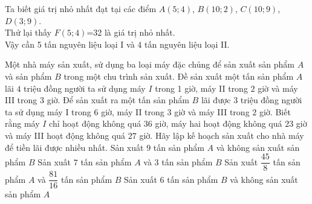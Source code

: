 \begin{ex}
{\begin{center}
		\end{center}
		Ta biết giá trị nhỏ nhất đạt tại các điểm $A(5;4)$, $B(10;2)$, $C(10;9)$, $D(3;9)$.\\
		Thử lại thấy $F(5;4)$=32 là giá trị nhỏ nhất.\\
		Vậy cần 5 tấn nguyên liệu loại I và 4 tấn nguyên liệu loại II.
	}
\end{ex}

\begin{ex}%
	Một nhà máy sản xuất, sử dụng ba loại máy đặc chủng để sản xuất sản phẩm $A$ và sản phẩm $B$ trong một chu trình sản xuất. Đề sản xuất một tấn sản phẩm $A$ lãi $4$ triệu đồng người ta sử dụng máy $I$ trong 1 giờ, máy II trong $2$ giờ và máy III trong $3$ giờ. Để sản xuất ra một tấn sản phẩm $B$ lãi được $3$ triệu đồng người ta sử dụng máy I trong $6$ giờ, máy II trong $3$ giờ và máy III trong $2$ giờ. Biết rằng máy $I$ chỉ hoạt động không quá $36$ giờ, máy hai hoạt động không quá $23$ giờ và máy III hoạt động không quá $27$ giờ. Hãy lập kế hoạch sản xuất cho nhà máy để tiền lãi được nhiều nhất.
	\choice
	{Sản xuất $9$ tấn sản phẩm $A$ và không sản xuất sản phẩm $B$}
	{Sản xuất $7$ tấn sản phẩm $A$ và $3$ tấn sản phẩm $B$}
	{\True Sản xuất $\dfrac{45}{8}$ tấn sản phẩm $A$ và $\dfrac{81}{16}$ tấn sản phẩm $B$}
	{Sản xuất $6$ tấn sản phẩm $B$ và không sản xuất sản phẩm $A$}
\end{ex}
